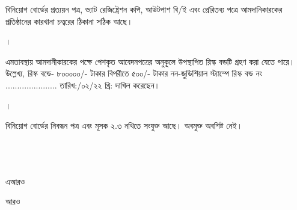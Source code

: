 \documentclass[12pt]{article}
\newcommand{\riskbonddate}{\hspace{2em}/০২/২২ খ্রি:}
\newcommand{\riskbondno}{......................}
\newcommand{\riskbondt}{৮০০০০০/-}
\newcommand{\riskbondg}{৫০০/-}
\begin{document}
\begin{minipage}[t]{0.96\linewidth}
বিনিয়োগ বোর্ডের প্রত্যয়ন পত্র,
ভ্যাট রেজিষ্ট্রেশন কপি,
আউটপাশ বি/ই এবং প্রেরিতব্য পত্রে
আমদানিকারকের প্রতিষ্ঠানের কারখানা চত্বরের
ঠিকানা সঠিক আছে।
\\
\end{minipage}
\begin{minipage}[t]{0.04\linewidth}
।
\end{minipage}
\begin{minipage}[t]{0.96\linewidth}
এমতাবস্থায় আমদানীকারকের পক্ষে
পেশকৃত আবেদনপত্রের অনুকূলে
উপস্থাপিত রিস্ক বন্ডটি গ্রহণ করা যেতে পারে।
উল্লেখ্য, রিস্ক বন্ডে-
{\riskbondt}
টাকার বিপরীতে
{\riskbondg}
টাকার নন-জুডিশিয়াল
স্ট্যাম্পে রিস্ক বন্ড নং {\riskbondno}
{তারিখ:\riskbonddate} দাখিল করেছেন।
\\
\end{minipage}
\begin{minipage}[t]{0.04\linewidth}
।
\end{minipage}
\begin{minipage}[t]{0.96\linewidth}
বিনিয়োগ বোর্ডের নিবন্ধন পত্র এবং
মূসক ২.৩ নথিতে সংযুক্ত আছে।
অবমুক্ত অবশিষ্ট নেই।
\\
\\
\\
\\
\end{minipage}
\normalsize
\begin{minipage}[t]{0.6\linewidth}
\hspace{1em}
\end{minipage}
\begin{minipage}[t]{0.2\linewidth}
এআরও
\end{minipage}
\begin{minipage}[t]{0.2\linewidth}
আরও
\end{minipage}
\thispagestyle{laststyle}
\end{document}
